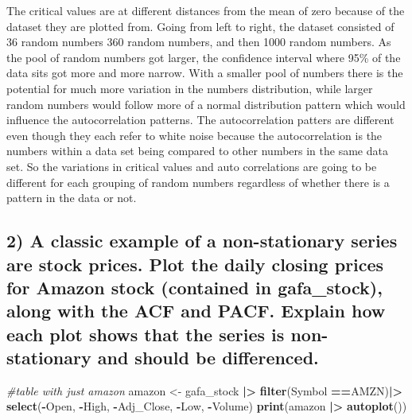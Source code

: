 \documentclass[
]{article}
\newenvironment{Shaded}{\begin{snugshade}}{\end{snugshade}}
\newcommand{\CommentTok}[1]{\textcolor[rgb]{0.56,0.35,0.01}{\textit{#1}}}
\newcommand{\FunctionTok}[1]{\textcolor[rgb]{0.13,0.29,0.53}{\textbf{#1}}}
\newcommand{\NormalTok}[1]{#1}
\newcommand{\OtherTok}[1]{\textcolor[rgb]{0.56,0.35,0.01}{#1}}
\newcommand{\SpecialCharTok}[1]{\textcolor[rgb]{0.81,0.36,0.00}{\textbf{#1}}}
\newcommand{\StringTok}[1]{\textcolor[rgb]{0.31,0.60,0.02}{#1}}
\begin{document}
The critical values are at different distances from the mean of zero
because of the dataset they are plotted from. Going from left to right,
the dataset consisted of 36 random numbers 360 random numbers, and then
1000 random numbers. As the pool of random numbers got larger, the
confidence interval where 95\% of the data sits got more and more
narrow. With a smaller pool of numbers there is the potential for much
more variation in the numbers distribution, while larger random numbers
would follow more of a normal distribution pattern which would influence
the autocorrelation patterns. The autocorrelation patters are different
even though they each refer to white noise because the autocorrelation
is the numbers within a data set being compared to other numbers in the
same data set. So the variations in critical values and auto
correlations are going to be different for each grouping of random
numbers regardless of whether there is a pattern in the data or not.

\subsection{2) A classic example of a non-stationary series are stock
prices. Plot the daily closing prices for Amazon stock (contained in
gafa\_stock), along with the ACF and PACF. Explain how each plot shows
that the series is non-stationary and should be
differenced.}\label{a-classic-example-of-a-non-stationary-series-are-stock-prices.-plot-the-daily-closing-prices-for-amazon-stock-contained-in-gafa_stock-along-with-the-acf-and-pacf.-explain-how-each-plot-shows-that-the-series-is-non-stationary-and-should-be-differenced.}

\begin{Shaded}
\begin{Highlighting}[]
\CommentTok{\#table with just amazon}
\NormalTok{amazon }\OtherTok{\textless{}{-}}\NormalTok{ gafa\_stock }\SpecialCharTok{|\textgreater{}} \FunctionTok{filter}\NormalTok{(Symbol }\SpecialCharTok{==}\StringTok{\textquotesingle{}AMZN\textquotesingle{}}\NormalTok{)}\SpecialCharTok{|\textgreater{}} \FunctionTok{select}\NormalTok{(}\SpecialCharTok{{-}}\NormalTok{Open, }\SpecialCharTok{{-}}\NormalTok{High, }\SpecialCharTok{{-}}\NormalTok{Adj\_Close, }\SpecialCharTok{{-}}\NormalTok{Low, }\SpecialCharTok{{-}}\NormalTok{Volume)}
\FunctionTok{print}\NormalTok{(amazon }\SpecialCharTok{|\textgreater{}} \FunctionTok{autoplot}\NormalTok{())}
\end{Highlighting}
\end{Shaded}
\end{document}
